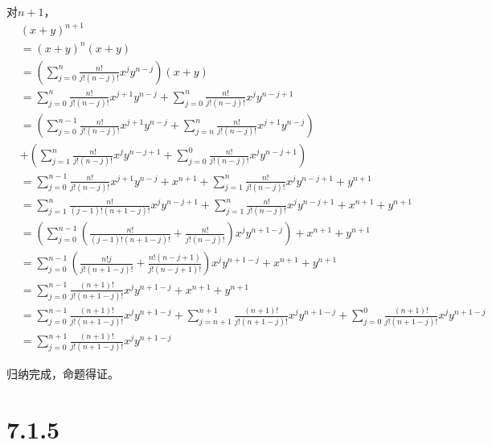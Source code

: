 \documentclass{article}
\theoremstyle{mystyle}
\begin{document}
对$n+1$，
\begin{align*}
        & (x+y)^{n+1}                                                                                        \\
        & = (x+y)^n (x+y)                                                                                    \\
        & = (\sum \limits_{j=0}^n \frac{n!}{j!(n-j)!} x^j y^{n-j}) (x+y)                                     \\
        & =
       \sum \limits_{j=0}^n \frac{n!}{j!(n-j)!} x^{j+1} y^{n-j}
       +
       \sum \limits_{j=0}^n \frac{n!}{j!(n-j)!} x^j y^{n-j+1}                                                \\
        & =
       (
       \sum \limits_{j=0}^{n-1} \frac{n!}{j!(n-j)!} x^{j+1} y^{n-j}
       +
       \sum \limits_{j=n}^{n} \frac{n!}{j!(n-j)!} x^{j+1} y^{n-j}
       )                                                                                                     \\
        & +
       (
       \sum \limits_{j=1}^n \frac{n!}{j!(n-j)!} x^j y^{n-j+1}
       +
       \sum \limits_{j=0}^0 \frac{n!}{j!(n-j)!} x^j y^{n-j+1}
       )                                                                                                     \\
        & = \sum \limits_{j=0}^{n-1} \frac{n!}{j!(n-j)!} x^{j+1} y^{n-j} + x^{n+1}
       + \sum \limits_{j=1}^n \frac{n!}{j!(n-j)!} x^j y^{n-j+1} + y^{n+1}                                    \\
        & = \sum \limits_{j=1}^{n} \frac{n!}{(j-1)!(n+1-j)!} x^{j} y^{n-j+1}
       + \sum \limits_{j=1}^n \frac{n!}{j!(n-j)!} x^j y^{n-j+1}
       + x^{n+1} + y^{n+1}                                                                                   \\
        & = (\sum \limits_{j=0}^{n-1} (\frac{n!}{(j-1)!(n+1-j)!} + \frac{n!}{j!(n-j)!}) x^{j} y^{n+1-j})
       + x^{n+1} + y^{n+1}                                                                                   \\
        & = \sum \limits_{j=0}^{n-1} (\frac{n!j}{j!(n+1-j)!} + \frac{n!(n-j+1)}{j!(n-j+1)!}) x^{j} y^{n+1-j}
       + x^{n+1} + y^{n+1}                                                                                   \\
        & =  \sum \limits_{j=0}^{n-1} \frac{(n+1)!}{j!(n+1-j)!} x^{j} y^{n+1-j}
       + x^{n+1} + y^{n+1}                                                                                   \\
        & =  \sum \limits_{j=0}^{n-1} \frac{(n+1)!}{j!(n+1-j)!} x^{j} y^{n+1-j}
       +  \sum \limits_{j=n+1}^{n+1} \frac{(n+1)!}{j!(n+1-j)!} x^{j} y^{n+1-j}
       +  \sum \limits_{j=0}^{0} \frac{(n+1)!}{j!(n+1-j)!} x^{j} y^{n+1-j}                                   \\
        & = \sum \limits_{j=0}^{n+1} \frac{(n+1)!}{j!(n+1-j)!} x^{j} y^{n+1-j}
\end{align*}

归纳完成，命题得证。

\section*{7.1.5}
\end{document}

